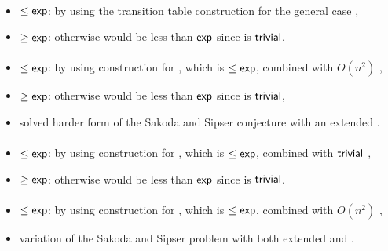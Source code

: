 \paragraph{\OLA{}\tto\ONFA}\label{cost:1DLAto1NFAu}
\begin{itemize}
	\item $\le\mathsf{exp}$: by using the transition table construction for the \hyperref[cost:1LAto1NFA]{general case} \cite{PigPis14},
	\item $\ge\mathsf{exp}$: otherwise \hyperref[cost:1DLAto1NFAu]{\ODLA{}\tto\ONFA} would be less than $\mathsf{exp}$ since \ODLA{}\tto\OLA is $\mathsf{trivial}$.
\end{itemize}
\paragraph{\OLA{}\tto\TDFA}
\begin{itemize}
	\item $\le\mathsf{exp}$: by using construction for \hyperref[cost:1LAto1NFAu]{\OLA{}\tto\ONFA}, which is $\le\mathsf{exp}$, combined with $O(n^2)$ \hyperref[cost:1NFAto2DFAu]{\ONFA{}\tto\TDFA},
	\item $\ge\mathsf{exp}$: otherwise \hyperref[cost:1DLAto2DFAu]{\ODLA{}\tto\TDFA} would be less than $\mathsf{exp}$ since \ODLA{}\tto\OLA is $\mathsf{trivial}$,
	\item solved harder form of the Sakoda and Sipser conjecture with an extended \TNFA.
\end{itemize}
\paragraph{\OLA{}\tto\TNFA}
\begin{itemize}
	\item $\le\mathsf{exp}$: by using construction for \hyperref[cost:1LAto1NFAu]{\OLA{}\tto\ONFA}, which is $\le\mathsf{exp}$, combined with $\mathsf{trivial}$ \ONFA{}\tto\TNFA,
	\item $\ge\mathsf{exp}$: otherwise \hyperref[cost:1DLAto2NFAu]{\ODLA{}\tto\TNFA} would be less than $\mathsf{exp}$ since \ODLA{}\tto\OLA is $\mathsf{trivial}$.
\end{itemize}
\paragraph{\OLA{}\tto\ODLA}
\begin{itemize}
	\item $\le\mathsf{exp}$: by using construction for \hyperref[cost:1LAto1NFAu]{\OLA{}\tto\ONFA}, which is $\le\mathsf{exp}$, combined with $O(n^2)$ \hyperref[cost:1NFAto1DLAu]{\ONFA{}\tto\ODLA},
	\item variation of the Sakoda and Sipser problem with both extended \TNFA and \TDFA.
\end{itemize}


